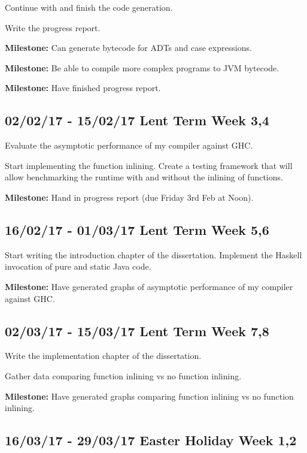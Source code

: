 \documentclass[12pt,a4paper,twoside]{article}
\begin{document}
    Continue with and finish the code generation.

    Write the progress report.

    \textbf{Milestone:} Can generate bytecode for ADTs and case expressions.

    \textbf{Milestone:} Be able to compile more complex programs to JVM bytecode.

    \textbf{Milestone:} Have finished progress report.

    \subsection*{02/02/17 - 15/02/17 \hfill Lent Term Week 3,4}

      Evaluate the asymptotic performance of my compiler against GHC.

      Start implementing the function inlining. Create a testing framework that will allow benchmarking the runtime with and without the
      inlining of functions.


      \textbf{Milestone:} Hand in progress report (due Friday 3rd Feb at Noon).

    \subsection*{16/02/17 - 01/03/17 \hfill Lent Term Week 5,6}

      Start writing the introduction chapter of the dissertation. Implement the Haskell invocation of pure and static Java code.

      \textbf{Milestone:} Have generated graphs of asymptotic performance of my compiler against GHC.

    \subsection*{02/03/17 - 15/03/17 \hfill Lent Term Week 7,8}

      Write the implementation chapter of the dissertation.

      Gather data comparing function inlining vs no function inlining.

     \textbf{Milestone:} Have generated graphs comparing function inlining vs no function inlining.

    \subsection*{16/03/17 - 29/03/17 \hfill Easter Holiday Week 1,2}
\end{document}
